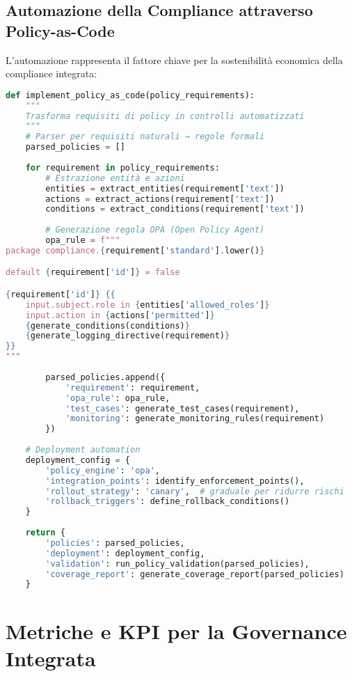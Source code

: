 \subsection{Automazione della Compliance attraverso Policy-as-Code}

L'automazione rappresenta il fattore chiave per la sostenibilità economica della compliance integrata:

\begin{lstlisting}[language=Python, caption=Policy-as-code implementation]
def implement_policy_as_code(policy_requirements):
    """
    Trasforma requisiti di policy in controlli automatizzati
    """
    # Parser per requisiti naturali → regole formali
    parsed_policies = []
    
    for requirement in policy_requirements:
        # Estrazione entità e azioni
        entities = extract_entities(requirement['text'])
        actions = extract_actions(requirement['text'])
        conditions = extract_conditions(requirement['text'])
        
        # Generazione regola OPA (Open Policy Agent)
        opa_rule = f"""
package compliance.{requirement['standard'].lower()}

default {requirement['id']} = false

{requirement['id']} {{
    input.subject.role in {entities['allowed_roles']}
    input.action in {actions['permitted']}
    {generate_conditions(conditions)}
    {generate_logging_directive(requirement)}
}}
"""
        
        parsed_policies.append({
            'requirement': requirement,
            'opa_rule': opa_rule,
            'test_cases': generate_test_cases(requirement),
            'monitoring': generate_monitoring_rules(requirement)
        })
        
    # Deployment automation
    deployment_config = {
        'policy_engine': 'opa',
        'integration_points': identify_enforcement_points(),
        'rollout_strategy': 'canary',  # graduale per ridurre rischi
        'rollback_triggers': define_rollback_conditions()
    }
    
    return {
        'policies': parsed_policies,
        'deployment': deployment_config,
        'validation': run_policy_validation(parsed_policies),
        'coverage_report': generate_coverage_report(parsed_policies)
    }
\end{lstlisting}

\section{Metriche e KPI per la Governance Integrata}

